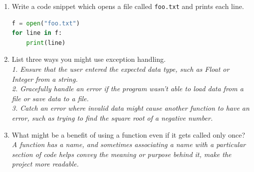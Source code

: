 \documentclass[letter,10pt]{article}
\begin{document}
\begin{enumerate}
\begin{lstlisting}[language=python]
subtotal = getUserInput("Enter the subtotal")
tip = getUserInput("Enter the tip")
if tip > 1.0:
    tip = subtotal / tip
else:
    tip = subtotal * tip
final_total = subtotal + tip
print("The total bill: ${:.2f}.".format(final_total))
    \end{lstlisting}

    \item Write a code snippet which opens a file called \texttt{foo.txt} and prints each line.
    \begin{lstlisting}[language=python]
f = open("foo.txt")
for line in f:
    print(line)
    \end{lstlisting}

    \item List three ways you might use exception handling. \\
    \textit{1. Ensure that the user entered the expected data type, such as Float or Integer from a string.\\2. Gracefully handle an error if the program wasn't able to load data from a file or save data to a file.\\3. Catch an error where invalid data might cause another function to have an error, such as trying to find the square root of a negative number.}

    \item What might be a benefit of using a function even if it gets called only once? \\
    \textit{A function has a name, and sometimes associating a name with a particular section of code helps convey the meaning or purpose behind it, make the project more readable.}

\end{enumerate}
\end{document}
